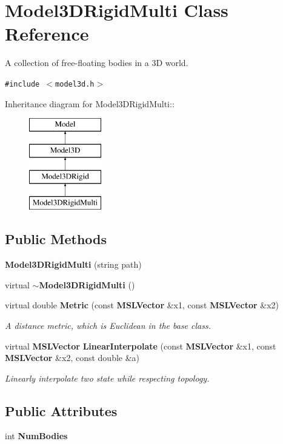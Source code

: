 \section{Model3DRigid\-Multi  Class Reference}
\label{class_Model3DRigidMulti}
A collection of free-floating bodies in a 3D world. 


{\tt \#include $<$model3d.h$>$}

Inheritance diagram for Model3DRigid\-Multi::\begin{figure}[H]
\begin{center}
\leavevmode
\includegraphics[height=4cm]{class_Model3DRigidMulti}
\end{center}
\end{figure}
\subsection*{Public Methods}
\begin{CompactItemize}
\item 
{\bf Model3DRigid\-Multi} (string path)
\item 
virtual {\bf $\sim$Model3DRigid\-Multi} ()
\item 
virtual double {\bf Metric} (const {\bf MSLVector} \&x1, const {\bf MSLVector} \&x2)
\begin{CompactList}\small\item\em A distance metric, which is Euclidean in the base class.\item\end{CompactList}\item 
virtual {\bf MSLVector} {\bf Linear\-Interpolate} (const {\bf MSLVector} \&x1, const {\bf MSLVector} \&x2, const double \&a)
\begin{CompactList}\small\item\em Linearly interpolate two state while respecting topology.\item\end{CompactList}\end{CompactItemize}
\subsection*{Public Attributes}
\begin{CompactItemize}
\item 
int {\bf Num\-Bodies}
\end{CompactItemize}


